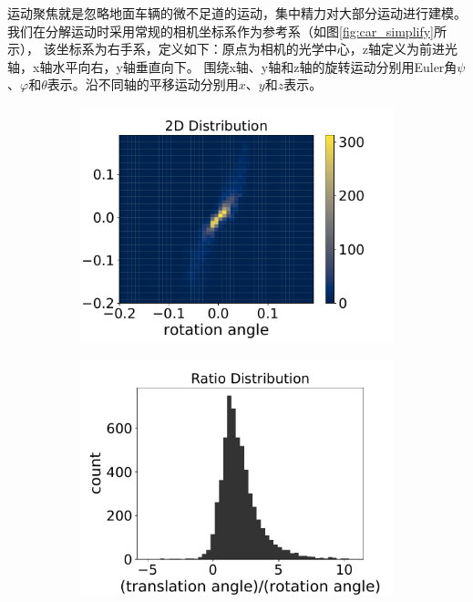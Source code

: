 运动聚焦就是忽略地面车辆的微不足道的运动，集中精力对大部分运动进行建模。我们在分解运动时采用常规的相机坐标系作为参考系（如图\ref{fig:car_simplify}所示），
该坐标系为右手系，定义如下：原点为相机的光学中心，z轴定义为前进光轴，x轴水平向右，y轴垂直向下。
围绕x轴、y轴和z轴的旋转运动分别用Euler角$\psi$、$\varphi$和$\theta$表示。沿不同轴的平移运动分别用$x$、$y$和$z$表示。

\begin{figure}[h]
    \centering
    \begin{subfigure}[b]{0.65\textwidth}
        \centering
        \includegraphics[width=\textwidth]{datavo/r_t_2d_hist.pdf}
        \caption{}
        \label{fig:rt_2d} 
        \vspace{4pt}
    \end{subfigure}
    \begin{subfigure}[b]{0.65\textwidth}
        \centering
        \includegraphics[width=\textwidth]{datavo/r_t_1d_hist.pdf}

\end{subfigure}
\end{figure}
